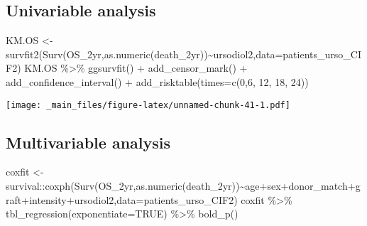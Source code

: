 \documentclass[
]{book}
\newenvironment{Shaded}{\begin{snugshade}}{\end{snugshade}}
\newcommand{\AttributeTok}[1]{\textcolor[rgb]{0.77,0.63,0.00}{#1}}
\newcommand{\ConstantTok}[1]{\textcolor[rgb]{0.00,0.00,0.00}{#1}}
\newcommand{\DecValTok}[1]{\textcolor[rgb]{0.00,0.00,0.81}{#1}}
\newcommand{\FunctionTok}[1]{\textcolor[rgb]{0.00,0.00,0.00}{#1}}
\newcommand{\NormalTok}[1]{#1}
\newcommand{\OtherTok}[1]{\textcolor[rgb]{0.56,0.35,0.01}{#1}}
\newcommand{\SpecialCharTok}[1]{\textcolor[rgb]{0.00,0.00,0.00}{#1}}
\begin{document}
\hypertarget{univariable-analysis}{%
\subsection{Univariable analysis}\label{univariable-analysis}}

\begin{Shaded}
\begin{Highlighting}[]
\NormalTok{KM.OS }\OtherTok{\textless{}{-}} \FunctionTok{survfit2}\NormalTok{(}\FunctionTok{Surv}\NormalTok{(OS\_2yr,}\FunctionTok{as.numeric}\NormalTok{(death\_2yr))}\SpecialCharTok{\textasciitilde{}}\NormalTok{ursodiol2,}\AttributeTok{data=}\NormalTok{patients\_urso\_CIF2)}
\NormalTok{KM.OS }\SpecialCharTok{\%\textgreater{}\%} \FunctionTok{ggsurvfit}\NormalTok{() }\SpecialCharTok{+}
  \FunctionTok{add\_censor\_mark}\NormalTok{() }\SpecialCharTok{+}
  \FunctionTok{add\_confidence\_interval}\NormalTok{() }\SpecialCharTok{+}
  \FunctionTok{add\_risktable}\NormalTok{(}\AttributeTok{times=}\FunctionTok{c}\NormalTok{(}\DecValTok{0}\NormalTok{,}\DecValTok{6}\NormalTok{, }\DecValTok{12}\NormalTok{, }\DecValTok{18}\NormalTok{, }\DecValTok{24}\NormalTok{))}
\end{Highlighting}
\end{Shaded}

\texttt{[image: \_main\_files/figure-latex/unnamed-chunk-41-1.pdf]}

\hypertarget{multivariable-analysis}{%
\subsection{Multivariable analysis}\label{multivariable-analysis}}

\begin{Shaded}
\begin{Highlighting}[]
\NormalTok{coxfit }\OtherTok{\textless{}{-}}\NormalTok{ survival}\SpecialCharTok{::}\FunctionTok{coxph}\NormalTok{(}\FunctionTok{Surv}\NormalTok{(OS\_2yr,}\FunctionTok{as.numeric}\NormalTok{(death\_2yr))}\SpecialCharTok{\textasciitilde{}}\NormalTok{age}\SpecialCharTok{+}\NormalTok{sex}\SpecialCharTok{+}\NormalTok{donor\_match}\SpecialCharTok{+}\NormalTok{graft}\SpecialCharTok{+}\NormalTok{intensity}\SpecialCharTok{+}\NormalTok{ursodiol2,}\AttributeTok{data=}\NormalTok{patients\_urso\_CIF2)}
\NormalTok{coxfit }\SpecialCharTok{\%\textgreater{}\%} \FunctionTok{tbl\_regression}\NormalTok{(}\AttributeTok{exponentiate=}\ConstantTok{TRUE}\NormalTok{) }\SpecialCharTok{\%\textgreater{}\%} \FunctionTok{bold\_p}\NormalTok{()}
\end{Highlighting}
\end{Shaded}
\end{document}
